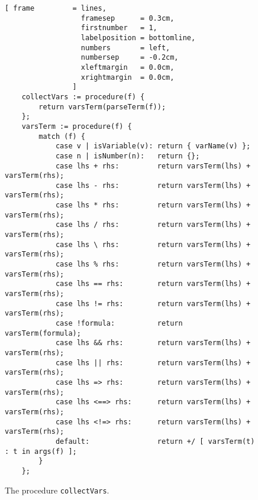 \begin{figure}[!ht]
\centering
\begin{Verbatim}[ frame         = lines, 
                  framesep      = 0.3cm, 
                  firstnumber   = 1,
                  labelposition = bottomline,
                  numbers       = left,
                  numbersep     = -0.2cm,
                  xleftmargin   = 0.0cm,
                  xrightmargin  = 0.0cm,
                ]
    collectVars := procedure(f) {
        return varsTerm(parseTerm(f));
    };
    varsTerm := procedure(f) {
        match (f) {
            case v | isVariable(v): return { varName(v) };
            case n | isNumber(n):   return {};
            case lhs + rhs:         return varsTerm(lhs) + varsTerm(rhs);
            case lhs - rhs:         return varsTerm(lhs) + varsTerm(rhs);
            case lhs * rhs:         return varsTerm(lhs) + varsTerm(rhs);
            case lhs / rhs:         return varsTerm(lhs) + varsTerm(rhs);
            case lhs \ rhs:         return varsTerm(lhs) + varsTerm(rhs);
            case lhs % rhs:         return varsTerm(lhs) + varsTerm(rhs);
            case lhs == rhs:        return varsTerm(lhs) + varsTerm(rhs);
            case lhs != rhs:        return varsTerm(lhs) + varsTerm(rhs);
            case !formula:          return varsTerm(formula);
            case lhs && rhs:        return varsTerm(lhs) + varsTerm(rhs);
            case lhs || rhs:        return varsTerm(lhs) + varsTerm(rhs);
            case lhs => rhs:        return varsTerm(lhs) + varsTerm(rhs);
            case lhs <==> rhs:      return varsTerm(lhs) + varsTerm(rhs);
            case lhs <!=> rhs:      return varsTerm(lhs) + varsTerm(rhs);
            default:                return +/ [ varsTerm(t) : t in args(f) ];
        }
    };
\end{Verbatim}
\vspace*{-0.3cm}
\caption{The procedure \texttt{collectVars}.}
\label{fig:collectVars.stlx}
\end{figure}


